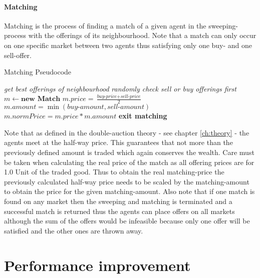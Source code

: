 \documentclass[Bachelorarbeit.tex]{subfiles}
\begin{document}
\paragraph{Matching}
Matching is the process of finding a match of a given agent in the sweeping-process with the offerings of its neighbourhood. Note that a match can only occur on one specific market between two agents thus satisfying only one buy- and one sell-offer.

\begin{algorithm}
\caption{Matching Pseudocode}\label{euclid}
\begin{algorithmic}[1]
\State \textit{get best offerings of neighbourhood}
	\State \textit{randomly check sell or buy offerings first}
		\State $m \gets \textbf{new Match}$
		\State $m.price = \frac{\textit{buy-price} + \textit{sell-price}}{2}$
		\State $m.amount = \min(\textit{buy-amount}, \textit{sell-amount})$
		\State $m.normPrice = m.price * m.amount$
		\State \textbf{exit matching}
	\EndIf
\EndFor
\end{algorithmic}
\end{algorithm}

Note that as defined in the double-auction theory - see chapter \ref{ch:theory} - the agents meet at the half-way price. This guarantees that not more than the previously defined amount is traded which again conserves the wealth. Care must be taken when calculating the real price of the match as all offering prices are for 1.0 Unit of the traded good. Thus to obtain the real matching-price the previously calculated half-way price needs to be scaled by the matching-amount to obtain the price for the given matching-amount.
\medskip
Also note that if one match is found on any market then the sweeping and matching is terminated and a successful match is returned thus the agents can place offers on all markets although the sum of the offers would be infeasible because only one offer will be satisfied and the other ones are thrown away.

\section{Performance improvement}
\label{sec:implementation_performanceImprovement}
\end{document}
